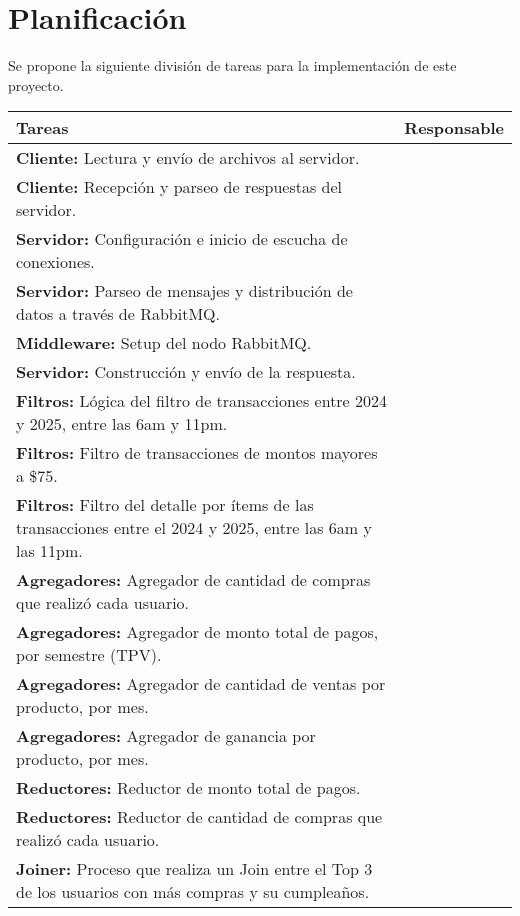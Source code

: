 \newpage
\section{Planificación}

Se propone la siguiente división de tareas para la implementación de este proyecto.

\begin{table}[H]
\centering
\renewcommand{\arraystretch}{1.3} %
\begin{tabularx}{\textwidth}{|X|l|}
\hline
\textbf{\centering Tareas} & \textbf{Responsable} \\ \hline
\textbf{Cliente:} Lectura y envío de archivos al servidor. &  \\ \hline
\textbf{Cliente:} Recepción y parseo de respuestas del servidor. &  \\ \hline
\textbf{Servidor:} Configuración e inicio de escucha de conexiones. &  \\ \hline
\textbf{Servidor:} Parseo de mensajes y distribución de datos a través de RabbitMQ. &  \\ \hline
\textbf{Middleware:} Setup del nodo RabbitMQ. &  \\ \hline
\textbf{Servidor:} Construcción y envío de la respuesta. &  \\ \hline
\textbf{Filtros:} Lógica del filtro de transacciones entre 2024 y 2025, entre las 6am y 11pm. &  \\ \hline
\textbf{Filtros:} Filtro de transacciones de montos mayores a \$75. &  \\ \hline
\textbf{Filtros:} Filtro del detalle por ítems de las transacciones entre el 2024 y 2025, entre las 6am y las 11pm. &  \\ \hline
\textbf{Agregadores:} Agregador de cantidad de compras que realizó cada usuario. &  \\ \hline
\textbf{Agregadores:} Agregador de monto total de pagos, por semestre (TPV). &  \\ \hline
\textbf{Agregadores:} Agregador de cantidad de ventas por producto, por mes. &  \\ \hline
\textbf{Agregadores:} Agregador de ganancia por producto, por mes. &  \\ \hline
\textbf{Reductores:} Reductor de monto total de pagos. &  \\ \hline
\textbf{Reductores:} Reductor de cantidad de compras que realizó cada usuario. &  \\ \hline
\textbf{Joiner:} Proceso que realiza un Join entre el Top 3 de los usuarios con más compras y su cumpleaños. &  \\ \hline

\end{tabularx}
\end{table}
